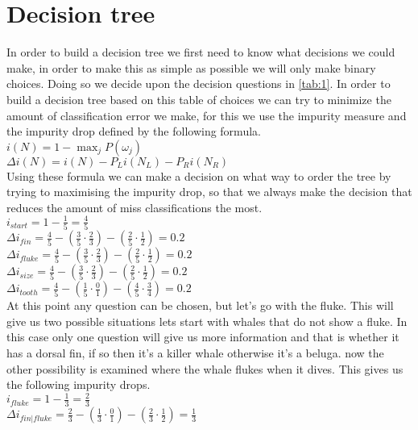 \documentclass[10pt,a4paper]{article}
\begin{document}
{\section{Decision tree}
In order to build a decision tree we first need to know what decisions we could make, in order to make this as simple as possible we will only make binary choices. Doing so we decide upon the decision questions in \ref{tab:1}. 
In order to build a decision tree based on this table of choices we can try to minimize the amount of classification error we make, for this we use the impurity measure and the impurity drop defined by the following formula.\\
$i \left ( N \right ) = 1 - \max _{j} P\left ( \omega _{j} \right )$\\
$\Delta i \left ( N \right ) = i \left ( N \right ) - P_{L}i\left ( N_{L} \right ) - P_{R}i\left ( N_{R} \right )$\\
Using these formula we can make a decision on what way to order the tree by trying to maximising the impurity drop, so that we always make the decision that reduces the amount of miss classifications the most.\\
$i_{start} = 1 - \frac{1}{5} = \frac{4}{5} $\\
$\Delta i_{fin} = \frac{4}{5} - \left ( \frac{3}{5}  \cdot \frac{2}{3} \right ) - \left ( \frac{2}{5} \cdot \frac{1}{2}\right ) = 0.2$\\
$\Delta i_{fluke} = \frac{4}{5} - \left ( \frac{3}{5}  \cdot \frac{2}{3} \right ) - \left ( \frac{2}{5} \cdot \frac{1}{2}\right ) = 0.2$\\
$\Delta i_{size} = \frac{4}{5} - \left ( \frac{3}{5}  \cdot \frac{2}{3} \right ) - \left ( \frac{2}{5} \cdot \frac{1}{2}\right ) = 0.2$\\
$\Delta i_{tooth} = \frac{4}{5} - \left ( \frac{1}{5}  \cdot \frac{0}{1} \right ) - \left ( \frac{4}{5} \cdot \frac{3}{4}\right ) = 0.2$\\
At this point any question can be chosen, but let’s go with the fluke.
This will give us two possible situations lets start with whales that do not show a fluke. In this case only one question will give us more information and that is whether it has a dorsal fin, if so then it's a killer whale otherwise it's a beluga.
now the other possibility is examined where the whale flukes when it dives. This gives us the following impurity drops.\\
$i_{fluke} = 1 - \frac{1}{3} = \frac{2}{3} $\\
$\Delta i_{fin | fluke} = \frac{2}{3} - \left ( \frac{1}{3}  \cdot \frac{0}{1} \right ) - \left ( \frac{2}{3} \cdot \frac{1}{2}\right ) = \frac{1}{3}$\\
}
\end{document}
